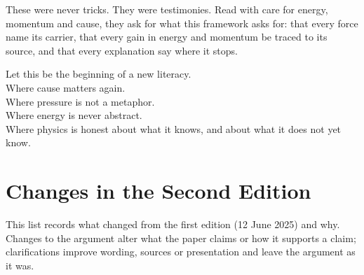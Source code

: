\documentclass[11pt,a4paper]{article}
\begin{document}
These were never tricks. They were testimonies. Read with care for energy, momentum and cause, they ask for what this framework asks for: that every force name its carrier, that every gain in energy and momentum be traced to its source, and that every explanation say where it stops.

Let this be the beginning of a new literacy.\\
Where cause matters again.\\
Where pressure is not a metaphor.\\
Where energy is never abstract.\\
Where physics is honest about what it knows, and about what it does not yet know.

\clearpage
\section*{Changes in the Second Edition}

This list records what changed from the first edition (12 June 2025) and why. Changes to the argument alter what the paper claims or how it supports a claim; clarifications improve wording, sources or presentation and leave the argument as it was.
\end{document}
